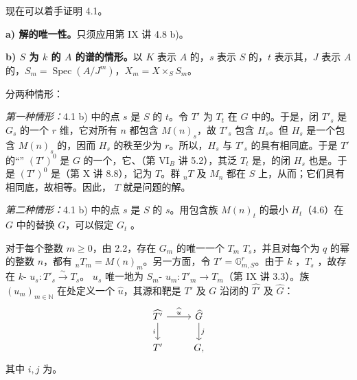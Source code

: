 现在可以着手证明 4.1。

\textbf{a) 解的唯一性。}只须应用第 IX 讲 4.8 b)。

\textbf{b) $S$ 为 $k$ 的 $A$ 的谱的情形。}以 $K$ 表示 $A$ 的，$s$ 表示 $S$ 的，$t$ 表示其，$J$ 表示 $A$ 的，$S_m=\operatorname{Spec}(A/J^m)$，$X_m=X\times_SS_m$。

分两种情形：

\emph{第一种情形：}4.1 b) 中的点 $s$ 是 $S$ 的 $t$。令 $T'$ 为 $T_t$ 在 $G$ 中的。于是，闭 $T'_s$ 是 $G_s$ 的一个 $r$ 维，它对所有 $n$ 都包含 $M(n)_s$，故 $T'_s$ 包含 $H_s$。但 $H_s$ 是一个包含 $M(n)_s$ 的，因而 $H_s$ 的秩至少为 $r$。所以，$H_s$ 与 $T'_s$ 的具有相同底。于是 $T'$ 的“” $(T')^0$ 是 $G$ 的一个，它、（第 VI$_B$ 讲 5.2），其泛 $T_t$ 是，的闭 $H_s$ 也是。于是 $(T')^0$ 是（第 X 讲 8.8），记为 $T$。群 ${}_nT$ 及 $M_n$ 都在 $S$ 上，从而；它们具有相同底，故相等。因此， $T$ 就是问题的解。

\emph{第二种情形：}4.1 b) 中的点 $s$ 是 $S$ 的 $s$。用包含族 $M(n)_t$ 的最小 $H_t$（4.6）在 $G$ 中的替换 $G$，可以假定 $G_t$ 。

对于每个整数 $m\geq0$，由 2.2，存在 $G_m$ 的唯一一个 $T_m$  $T_s$，并且对每个为 $q$ 的幂的整数 $n$，都有 ${}_nT_m=M(n)_m$。另一方面，令 $T'=\mathbb G_{m,S}^r$。由于 $k$ ，$T_s$ ，故存在 $k$- $u_s:T'_s\xrightarrow{\sim}T_s$。 $u_s$ 唯一地为 $S_m$- $u_m:T'_m\to T_m$（第 IX 讲 3.3）。族 $(u_m)_{m\in\mathbb N}$ 在处定义一个 $\widehat u$，其源和靶是 $T'$ 及 $G$ 沿闭的
$\widehat{T'}$ 及 $\widehat G$：
\[
\begin{tikzcd}
\widehat{T'}\arrow[r,"\widehat u"]\arrow[d,"i"']&\widehat G\arrow[d,"j"]\\
T'&G,
\end{tikzcd}
\]
其中 $i,j$ 为。


